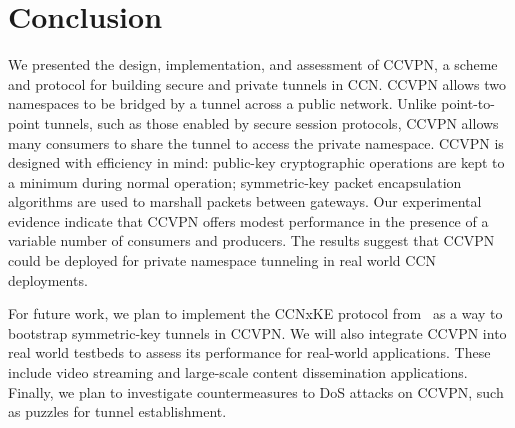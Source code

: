 \documentclass[conference,letterpaper,10pt]{IEEEtran}
\begin{document}
\section{Conclusion}\label{sec:conclusion}
We presented the design, implementation, and assessment of CCVPN, a scheme and
protocol for building secure and private tunnels in CCN. CCVPN allows two namespaces
to be bridged by a tunnel across a public network. Unlike point-to-point tunnels,
such as those enabled by secure session protocols, CCVPN allows many consumers
to share the tunnel to access the private namespace. CCVPN is designed with efficiency
in mind: public-key cryptographic operations are kept to a minimum during normal
operation; symmetric-key packet encapsulation algorithms are used to marshall
packets between gateways. Our experimental evidence indicate that CCVPN offers
modest performance in the presence of a variable number of consumers and producers.
The results suggest that CCVPN could be deployed for private namespace tunneling
in real world CCN deployments.

For future work, we plan to implement the CCNxKE protocol from~\cite{ccnxke} as a
way to bootstrap symmetric-key tunnels in CCVPN. We will also integrate CCVPN into
real world testbeds to assess its performance for real-world applications. These
include video streaming and large-scale content dissemination applications. Finally,
we plan to investigate countermeasures to DoS attacks on CCVPN, such as puzzles for tunnel establishment.

\ifCLASSOPTIONcaptionsoff
  \newpage
\fi

\tiny




\end{document}
